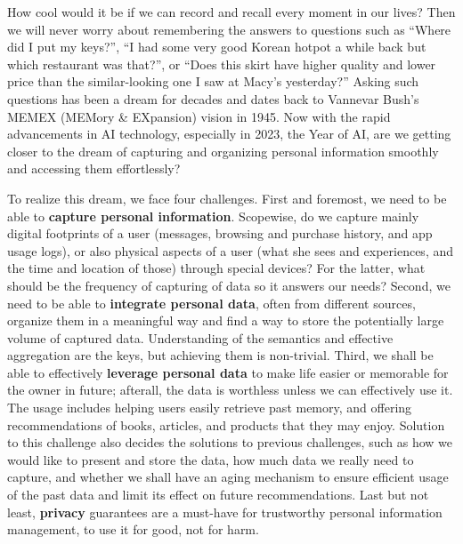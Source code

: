 \documentclass[11pt]{article}
\begin{document}
How cool would it be if we can record and recall every moment in our lives? Then we will never worry about remembering the answers to questions such as ``Where did I put my keys?'', ``I had some very good Korean hotpot a while back but which restaurant was that?'', 
or ``Does this skirt have higher quality and lower price than the similar-looking one I saw at Macy's yesterday?'' Asking such questions has been a dream for decades and dates back to Vannevar Bush's MEMEX (MEMory \& EXpansion) vision in 1945. Now with the rapid advancements in AI technology, especially in 2023, the Year of AI, are we getting closer to the dream of capturing and organizing personal information smoothly and accessing them effortlessly?

To realize this dream, we face four challenges. First and foremost, we need to be able to {\bf capture personal information}. Scopewise, do we capture mainly digital footprints of a user (messages, browsing and purchase history, and app usage logs), or also physical aspects of a user (what she sees and experiences, and the time and location of those) through special devices? For the latter, what should be the frequency of capturing of data so it answers our needs? Second, we need to be able to {\bf integrate personal data}, often from different sources, organize them in a meaningful way and find a way to store the potentially large volume of captured data. Understanding of the semantics and effective aggregation are the keys, but achieving them is non-trivial. Third, we shall be able to effectively {\bf leverage personal data} to make life easier or memorable for the owner in future; afterall, the data is worthless unless we can effectively use it. The usage includes helping users easily retrieve past memory, and offering recommendations of books, articles, and products that they may enjoy. Solution to this challenge also decides the solutions to previous challenges, such as how we would like to present and store the data, how much data we really need to capture, and whether we shall have an aging mechanism to ensure efficient usage of the past data and limit its effect on future recommendations. Last but not least, {\bf privacy} guarantees are a must-have for trustworthy personal information management, to use it for good, not for harm.
\end{document}
